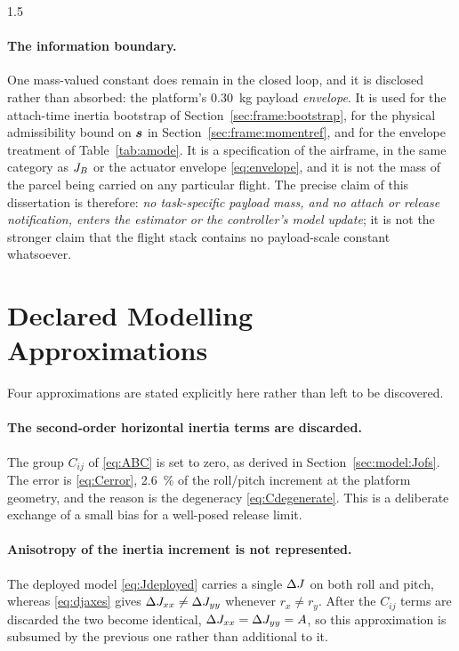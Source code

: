 \begin{spacing}{1.5}
\paragraph{The information boundary.} One mass-valued constant does remain in the
closed loop, and it is disclosed rather than absorbed: the platform's
\SI{0.30}{\kg} payload \emph{envelope}. It is used for the attach-time inertia
bootstrap of Section~\ref{sec:frame:bootstrap}, for the physical admissibility
bound on $\bm{s}$ in Section~\ref{sec:frame:momentref}, and for the envelope
treatment of Table~\ref{tab:amode}. It is a specification of the airframe, in the
same category as $J_B$ or the actuator envelope \eqref{eq:envelope}, and it is
not the mass of the parcel being carried on any particular flight. The precise
claim of this dissertation is therefore: \emph{no task-specific payload mass, and
no attach or release notification, enters the estimator or the controller's model
update}; it is not the stronger claim that the flight stack contains no
payload-scale constant whatsoever.

\section{Declared Modelling Approximations}\label{sec:model:approx}

Four approximations are stated explicitly here rather than left to be discovered.

\paragraph{The second-order horizontal inertia terms are discarded.} The group
$C_{ij}$ of \eqref{eq:ABC} is set to zero, as derived in
Section~\ref{sec:model:Jofs}. The error is \eqref{eq:Cerror},
\SI{2.6}{\percent} of the roll/pitch increment at the platform geometry, and the
reason is the degeneracy \eqref{eq:Cdegenerate}. This is a deliberate exchange of
a small bias for a well-posed release limit.

\paragraph{Anisotropy of the inertia increment is not represented.} The deployed
model \eqref{eq:Jdeployed} carries a single $\Delta J$ on both roll and pitch, whereas
\eqref{eq:djaxes} gives $\Delta J_{xx}\ne\Delta J_{yy}$ whenever $r_x\ne r_y$. After the
$C_{ij}$ terms are discarded the two become identical, $\Delta J_{xx}=\Delta J_{yy}=A$, so
this approximation is subsumed by the previous one rather than additional to it.


\end{spacing}
